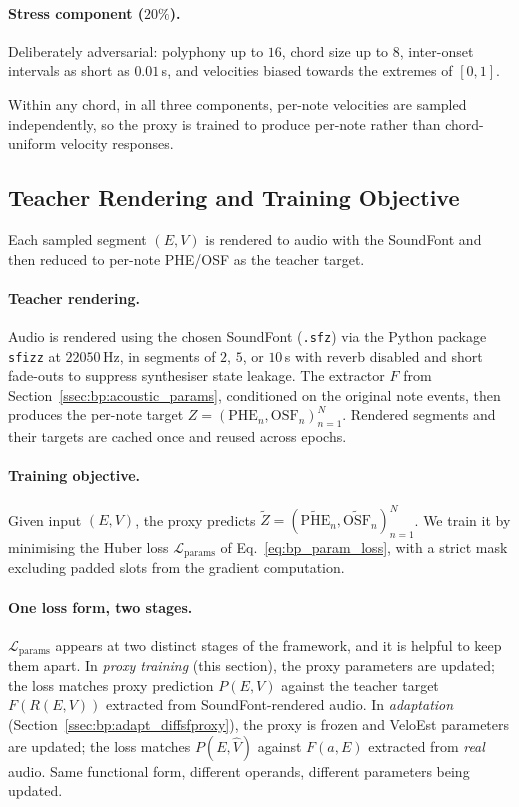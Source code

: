 \paragraph{Stress component ($20\%$).}
Deliberately adversarial: polyphony up to $16$, chord size up to $8$, inter-onset intervals as short as $0.01$\,s, and velocities biased towards the extremes of $[0, 1]$.

Within any chord, in all three components, per-note velocities are sampled independently, so the proxy is trained to produce per-note rather than chord-uniform velocity responses.

\subsection{Teacher Rendering and Training Objective}
\label{ssec:bp:proxy_training}

Each sampled segment $(E, V)$ is rendered to audio with the SoundFont and then reduced to per-note PHE/OSF as the teacher target.

\paragraph{Teacher rendering.}
Audio is rendered using the chosen SoundFont (\texttt{.sfz}) via the Python package \texttt{sfizz} at $22050$\,Hz, in segments of $2$, $5$, or $10$\,s with reverb disabled and short fade-outs to suppress synthesiser state leakage. The extractor $F$ from Section~\ref{ssec:bp:acoustic_params}, conditioned on the original note events, then produces the per-note target $Z = (\mathrm{PHE}_n, \mathrm{OSF}_n)_{n=1}^{N}$. Rendered segments and their targets are cached once and reused across epochs.

\paragraph{Training objective.}
Given input $(E, V)$, the proxy predicts $\widetilde{Z} = (\widetilde{\mathrm{PHE}}_n, \widetilde{\mathrm{OSF}}_n)_{n=1}^{N}$. We train it by minimising the Huber loss $\mathcal{L}_{\mathrm{params}}$ of Eq.~\eqref{eq:bp_param_loss}, with a strict mask excluding padded slots from the gradient computation.

\paragraph{One loss form, two stages.}
$\mathcal{L}_{\mathrm{params}}$ appears at two distinct stages of the framework, and it is helpful to keep them apart. In \emph{proxy training} (this section), the proxy parameters are updated; the loss matches proxy prediction $P(E, V)$ against the teacher target $F(R(E, V))$ extracted from SoundFont-rendered audio. In \emph{adaptation} (Section~\ref{ssec:bp:adapt_diffsfproxy}), the proxy is frozen and VeloEst parameters are updated; the loss matches $P(E, \hat{V})$ against $F(a, E)$ extracted from \emph{real} audio. Same functional form, different operands, different parameters being updated.

